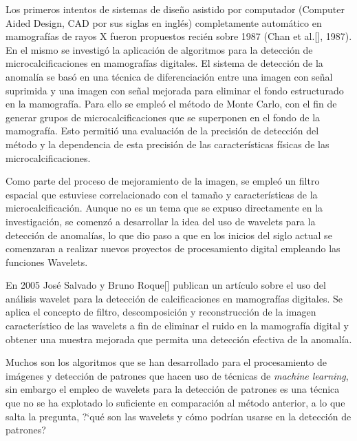 \par Los primeros intentos de sistemas de dise\~no asistido por computador (Computer Aided Design, CAD por sus siglas en ingl\'es) completamente automático en mamografías de rayos X fueron propuestos recién sobre 1987 (Chan et al.[\textcolor{cyan}{\cite{4}}], 1987). En el mismo se investig\'o la aplicaci\'on de algoritmos para la detecci\'on de microcalcificaciones en mamograf\'ias digitales. El sistema de detecci\'on de la anomal\'ia se bas\'o en una t\'ecnica de diferenciaci\'on entre una imagen con se\~nal suprimida y una imagen con se\~nal mejorada para eliminar el fondo estructurado en la mamografía. Para ello se emple\'o el m\'etodo de Monte Carlo, con el fin de generar grupos de microcalcificaciones que se superponen en el fondo de la mamograf\'ia. Esto permiti\'o una evaluación de la precisión de detección del método y la dependencia de esta precisión de las características físicas de las microcalcificaciones.

\par Como parte del proceso de mejoramiento de la imagen, se emple\'o un filtro espacial que estuviese correlacionado con el tama\~no y caracter\'isticas de la microcalcificaci\'on. Aunque no es un tema que se expuso directamente en la investigaci\'on, se comenz\'o a desarrollar la idea del uso de wavelets para la detecci\'on de anomal\'ias, lo que dio paso a que en los inicios del siglo actual se comenzaran a realizar nuevos proyectos de procesamiento digital empleando las funciones Wavelets.

\par En 2005 Jos\'e Salvado y Bruno Roque[\textcolor{cyan}{\cite{5}}] publican un art\'iculo sobre el uso del an\'alisis wavelet para la detecci\'on de calcificaciones en mamograf\'ias digitales. Se aplica el concepto de filtro, descomposici\'on y reconstrucci\'on de la imagen caracter\'istico de las wavelets a fin de eliminar el ruido en la mamograf\'ia digital y obtener una muestra mejorada que permita una detecci\'on efectiva de la anomal\'ia.

\par Muchos son los algoritmos que se han desarrollado para el procesamiento de im\'agenes y detecci\'on de patrones que hacen uso de t\'ecnicas de \textit{machine learning}, sin embargo el empleo de wavelets para la detecci\'on de patrones es una t\'ecnica que no se ha explotado lo suficiente en comparaci\'on al m\'etodo anterior, a lo que salta la pregunta, ?`qu\'e son las wavelets y c\'omo podr\'ian usarse en la detecci\'on de patrones?

